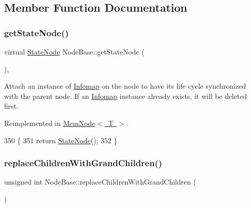 \subsection{Member Function Documentation}
\mbox{\label{classNodeBase_a1ea5960eead0b46f37108713eb8f2200}} 
\subsubsection{\texorpdfstring{get\+State\+Node()}{getStateNode()}}
{\footnotesize\ttfamily virtual \mbox{\hyperlink{structStateNode}{State\+Node}} Node\+Base\+::get\+State\+Node (\begin{DoxyParamCaption}{ }\end{DoxyParamCaption})\hspace{0.3cm}{\ttfamily [inline]}, {\ttfamily [virtual]}}

Attach an instance of \mbox{\hyperlink{classInfomap}{Infomap}} on the node to have its life cycle synchronized with the parent node.  If an \mbox{\hyperlink{classInfomap}{Infomap}} instance already exists, it will be deleted first. 

Reimplemented in \mbox{\hyperlink{classMemNode_a60aac298830b3ad469b8fae1ae21a1d0}{Mem\+Node$<$ T $>$}}.


\begin{DoxyCode}
350     \{
351         \textcolor{keywordflow}{return} \mbox{\hyperlink{structStateNode}{StateNode}}();
352     \}
\end{DoxyCode}
\mbox{\label{classNodeBase_a073a2bf2610b25e89b0f56a075c38a21}} 
\subsubsection{\texorpdfstring{replace\+Children\+With\+Grand\+Children()}{replaceChildrenWithGrandChildren()}}
{\footnotesize\ttfamily unsigned int Node\+Base\+::replace\+Children\+With\+Grand\+Children (\begin{DoxyParamCaption}{ }\end{DoxyParamCaption})\hspace{0.3cm}{\ttfamily [inline]}}

